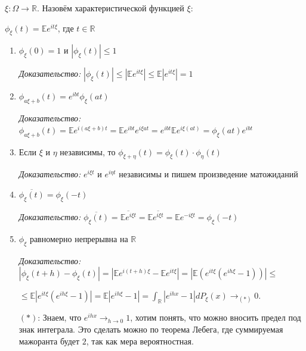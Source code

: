 \begin{definition}
    $\xi : \Omega \to \mathbb{R}$. Назовём характеристической функцией $\xi$:

    $\phi_\xi (t) = \mathbb{E} e^{it\xi}$, где $t \in \mathbb{R}$
\end{definition}

\begin{properties}
    \begin{enumerate}
        \item {
            $\phi_\xi (0) = 1$ и $|\phi_\xi (t)| \leqslant 1$

            \textit{Доказательство: } $|\phi_\xi (t)| \leqslant |\mathbb{E} e^{it\xi}| \leqslant \mathbb{E}|e^{it\xi}| = 1$
        }
        \item {
            $\phi_{a\xi + b} (t) = e^{ibt} \phi_\xi (at)$

            \textit{Доказательство: } $\phi_{a\xi + b} (t) = \mathbb{E} e^{i(a \xi + b)t} = \mathbb{E} e^{ibt} e^{i\xi a t} = e^{ibt} \mathbb{E} e^{i\xi (at)} = \phi_{\xi} (at) e^{ibt} $
        }
        \item {
            Если $\xi$ и $\eta$ независимы, то $\phi_{\xi + \eta} (t) = \phi_\xi (t) \cdot \phi_{\eta} (t)$

            \textit{Доказательство: } $e^{i\xi t}$ и $e^{i \eta t}$ независимы и пишем произведение матожиданий
        }
        \item {
            $\overline{\phi_{\xi}(t)} = \phi_{\xi} (-t)$

            \textit{Доказательство: } $\overline{\phi_{\xi}(t)} = \overline{\mathbb{E} e^{i \xi t}} = \mathbb{E} \overline{e^{i \xi t}} = \mathbb{E} e^{-i \xi t} = \phi_\xi (-t)$
        }
        \item {
            $\phi_{\xi}$ равномерно непрерывна на $\mathbb{R}$

            \textit{Доказательство: } $|\phi_{\xi}(t + h) - \phi_{\xi}(t)| = | \mathbb{E} e^{i (t + h) \xi} - \mathbb{E} e^{i t \xi} | = | \mathbb{E} \left( e^{it \xi} (e^{i h \xi} - 1) \right) | \leq $

            $\leq \mathbb{E} \left| e^{it \xi} (e^{i h \xi} - 1) \right| = \mathbb{E} | e^{i h \xi} - 1 | = \int_{\mathbb{R}} | e^{i h x} - 1 | d P_{\xi}(x) \rightarrow_{(*)} 0$.

            $(*)$: Знаем, что $e^{i h x} \rightarrow_{h \to 0} 1$, хотим понять, что можно вносить предел под знак интеграла. Это сделать можно по теорема Лебега, где суммируемая мажоранта будет $2$, так как мера вероятностная.

}
\end{enumerate}
\end{properties}
